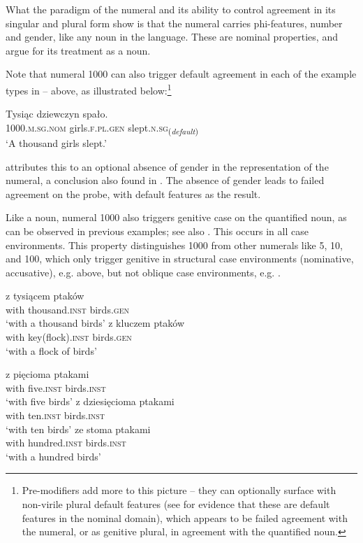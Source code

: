 \documentclass[output=paper]{langscibook}
\begin{document}
\noindent What the paradigm of the numeral and its ability to control agreement in its singular and plural form show is that the numeral carries phi-features, number and gender, like any noun in the language. These are nominal properties, and argue for its treatment as a noun. 

Note that numeral 1000 can also trigger default agreement in each of the example types in -- above, as illustrated below:\footnote{Pre-modifiers add more to this picture -- they can optionally surface with non-virile plural default features (see \citealt[121--122]{klockmann2017semiLex} for evidence that these are default features in the nominal domain), which appears to be failed agreement with the numeral, or as genitive plural, in agreement with the quantified noun.}

\ea\label{klo:ex:defagr1000}
\gll Tysiąc dziewczyn spało.\\
1000.\textsc{m.sg.nom} girls.\textsc{f.pl.gen} slept.\textsc{n.sg}\textsubscript{(\textit{default})}\\
\glt `A thousand girls slept.'
\z

\noindent \citet{klockmann2017semiLex} attributes this to an optional absence of gender in the representation of the numeral, a conclusion also found in \citet{i&m2018}. The absence of gender leads to failed agreement on the probe, with default features as the result.

Like a noun, numeral 1000 also triggers genitive case on the quantified noun, as can be observed in previous examples; see also . This occurs in all case environments. This property distinguishes 1000 from other numerals like 5, 10, and 100, which only trigger genitive in structural case environments (nominative, accusative), e.g.  above, but not oblique case environments, e.g. .

\ea \label{klo:ex:non-structuralCase}
\ea 
\gll z tysiącem ptaków\\
with thousand.\textsc{inst} birds.\textsc{gen}\\
\glt `with a thousand birds'
\ex  \gll z kluczem ptaków\\
with key(flock).\textsc{inst} birds.\textsc{gen}\\
\glt `with a flock of birds'
\z \z

\ea \label{klo:ex:5+obl}
\ea \gll z pięcioma ptakami\\
with five.\textsc{inst} birds.\textsc{inst}\\
\glt `with five birds'
\ex  \gll z dziesięcioma ptakami\\
with ten.\textsc{inst} birds.\textsc{inst}\\
\glt `with ten birds'
\ex  \gll ze stoma ptakami\\
with hundred.\textsc{inst} birds.\textsc{inst}\\
\glt `with a hundred birds'
\z \z %
\end{document}
